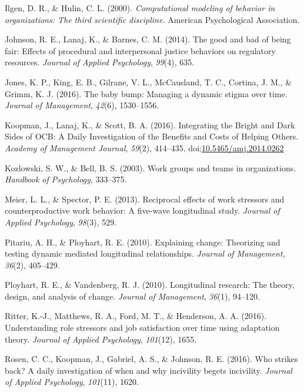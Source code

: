 \documentclass[english,,man]{apa6}
\theoremstyle{definition}
\theoremstyle{definition}
\theoremstyle{definition}
\theoremstyle{remark}
\begin{document}
\leavevmode\hypertarget{ref-ilgen_computational_2000}{}%
Ilgen, D. R., \& Hulin, C. L. (2000). \emph{Computational modeling of
behavior in organizations: The third scientific discipline.} American
Psychological Association.

\leavevmode\hypertarget{ref-johnson_good_2014}{}%
Johnson, R. E., Lanaj, K., \& Barnes, C. M. (2014). The good and bad of
being fair: Effects of procedural and interpersonal justice behaviors on
regulatory resources. \emph{Journal of Applied Psychology},
\emph{99}(4), 635.

\leavevmode\hypertarget{ref-jones_baby_2016}{}%
Jones, K. P., King, E. B., Gilrane, V. L., McCausland, T. C., Cortina,
J. M., \& Grimm, K. J. (2016). The baby bump: Managing a dynamic stigma
over time. \emph{Journal of Management}, \emph{42}(6), 1530--1556.

\leavevmode\hypertarget{ref-koopman_integrating_2016}{}%
Koopman, J., Lanaj, K., \& Scott, B. A. (2016). Integrating the Bright
and Dark Sides of OCB: A Daily Investigation of the Benefits and Costs
of Helping Others. \emph{Academy of Management Journal}, \emph{59}(2),
414--435.
doi:\href{https://doi.org/10.5465/amj.2014.0262}{10.5465/amj.2014.0262}

\leavevmode\hypertarget{ref-kozlowski_work_2003}{}%
Kozlowski, S. W., \& Bell, B. S. (2003). Work groups and teams in
organizations. \emph{Handbook of Psychology}, 333--375.

\leavevmode\hypertarget{ref-meier_reciprocal_2013}{}%
Meier, L. L., \& Spector, P. E. (2013). Reciprocal effects of work
stressors and counterproductive work behavior: A five-wave longitudinal
study. \emph{Journal of Applied Psychology}, \emph{98}(3), 529.

\leavevmode\hypertarget{ref-pitariu_explaining_2010}{}%
Pitariu, A. H., \& Ployhart, R. E. (2010). Explaining change: Theorizing
and testing dynamic mediated longitudinal relationships. \emph{Journal
of Management}, \emph{36}(2), 405--429.

\leavevmode\hypertarget{ref-ployhart_longitudinal_2010}{}%
Ployhart, R. E., \& Vandenberg, R. J. (2010). Longitudinal research: The
theory, design, and analysis of change. \emph{Journal of Management},
\emph{36}(1), 94--120.

\leavevmode\hypertarget{ref-ritter_understanding_2016}{}%
Ritter, K.-J., Matthews, R. A., Ford, M. T., \& Henderson, A. A. (2016).
Understanding role stressors and job satisfaction over time using
adaptation theory. \emph{Journal of Applied Psychology}, \emph{101}(12),
1655.

\leavevmode\hypertarget{ref-rosen_who_2016}{}%
Rosen, C. C., Koopman, J., Gabriel, A. S., \& Johnson, R. E. (2016). Who
strikes back? A daily investigation of when and why incivility begets
incivility. \emph{Journal of Applied Psychology}, \emph{101}(11), 1620.
\end{document}

